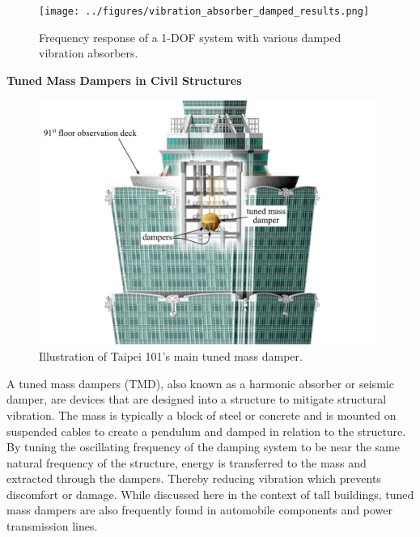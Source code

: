 \documentclass[12pt,letter]{article}
\begin{document}
\begin{figure}[H]
    \centering
    \texttt{[image: ../figures/vibration\_absorber\_damped\_results.png]}
    \caption{Frequency response of a 1-DOF system with various damped vibration absorbers.}
    \label{fig:vibration_absorber_damped_results}
\end{figure}

\pagebreak
\begin{vibration_case_study}

\textbf{Tuned Mass Dampers in Civil Structures}

	\begin{figure}[H]
		\centering
		\includegraphics[width=5in]{../figures/Taipei_101_with_damper}
		\caption{Illustration of Taipei 101's main tuned mass damper. \protect\footnotemark[1]}
	\end{figure}
	
	A tuned mass dampers (TMD), also known as a harmonic absorber or seismic damper, are devices that are designed into a structure to mitigate structural vibration. The mass is typically a block of steel or concrete and is mounted on suspended cables to create a pendulum and damped in relation to the structure. By tuning the oscillating frequency of the damping system to be near the same natural frequency of the structure, energy is transferred to the mass and extracted through the dampers. Thereby reducing vibration which prevents discomfort or damage. While discussed here in the context of tall buildings, tuned mass dampers are also frequently found in automobile components and power transmission lines.	
	
\end{vibration_case_study}
\vspace{-1ex}
\end{document}
